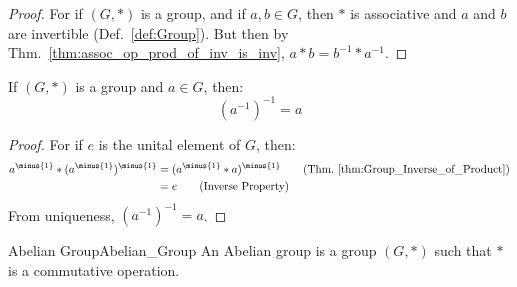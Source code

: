     \begin{proof}
        For if $(G,*)$ is a group, and if $a,b\in{G}$, then $*$ is associative
        and $a$ and $b$ are invertible (Def.~\ref{def:Group}). But then by
        Thm.~\ref{thm:assoc_op_prod_of_inv_is_inv},
        $a*b=b^{\minus{1}}*a^{\minus{1}}$.
    \end{proof}
    \begin{theorem}
        If $(G,*)$ is a group and $a\in{G}$, then:
        \begin{equation}
            (a^{\minus{1}})^{\minus{1}}=a
        \end{equation}
    \end{theorem}
    \begin{proof}
        For if $e$ is the unital element of $G$, then:
        \begin{align}
            a^{\minus{1}}*(a^{\minus{1}})^{\minus{1}}
            &=(a^{\minus{1}}* a)^{\minus{1}}
            \tag{Thm.~\ref{thm:Group_Inverse_of_Product}}\\
            &=e
            \tag{Inverse Property}
        \end{align}
        From uniqueness, $(a^{\minus{1}})^{\minus{1}}=a$.
    \end{proof}
    \begin{fdefinition}{Abelian Group}{Abelian_Group}
        An \gls{Abelian group} is a \gls{group} $(G,*)$ such that $*$ is
        a \gls{commutative operation}.
    \end{fdefinition}
